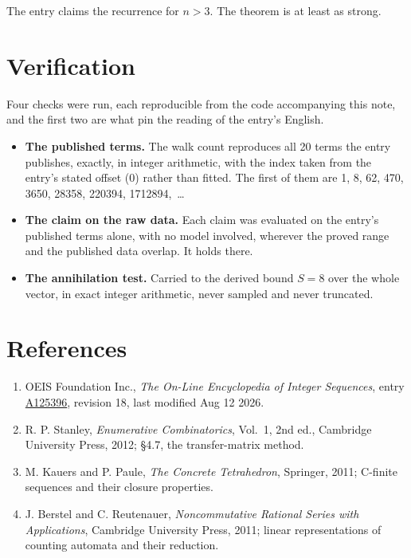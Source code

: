 \documentclass[11pt]{article}
\theoremstyle{definition}
\begin{document}
The entry claims the recurrence for $n > 3$. The theorem is at least as strong.

\section{Verification}

Four checks were run, each reproducible from the code accompanying this note, and the first two are what pin the reading of the entry's English.

\begin{itemize}

\item {\bfseries The published terms.} The walk count reproduces all 20 terms the entry publishes, exactly, in integer arithmetic, with the index taken from the entry's stated offset (0) rather than fitted. The first of them are 1, 8, 62, 470, 3650, 28358, 220394, 1712894,~\dots

\item {\bfseries The claim on the raw data.} Each claim was evaluated on the entry's published terms alone, with no model involved, wherever the proved range and the published data overlap. It holds there.

\item {\bfseries The annihilation test.} Carried to the derived bound $S = 8$ over the whole vector, in exact integer arithmetic, never sampled and never truncated.

\end{itemize}

\section{References}

\begin{enumerate}

\item OEIS Foundation Inc., \emph{The On-Line Encyclopedia of Integer Sequences}, entry \href{https://oeis.org/A125396}{A125396}, revision 18, last modified Aug 12 2026.

\item R. P. Stanley, \emph{Enumerative Combinatorics}, Vol.~1, 2nd ed., Cambridge University Press, 2012; \S4.7, the transfer-matrix method.

\item M. Kauers and P. Paule, \emph{The Concrete Tetrahedron}, Springer, 2011; C-finite sequences and their closure properties.

\item J. Berstel and C. Reutenauer, \emph{Noncommutative Rational Series with Applications}, Cambridge University Press, 2011; linear representations of counting automata and their reduction.

\end{enumerate}
\end{document}
